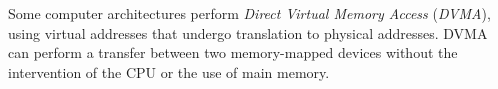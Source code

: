 \begin{definition}
  \begin{remark}\label{rmk:Direct_Virtual_Memory_Access}
    Some computer architectures perform \emph{Direct Virtual Memory Access} (\emph{DVMA}), using virtual addresses that undergo translation to physical addresses.
    DVMA can perform a transfer between two memory-mapped devices without the intervention of the CPU or the use of main memory.
  \end{remark}
\end{definition}



